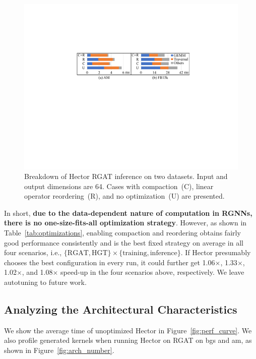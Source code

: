 \begin{figure}[!htbp]
\centering
\includegraphics[width=
\linewidth]{figures/Hector/FB15K.AM.BreakdownEvalv3.compact.pdf}
\caption{\label{fig:perf_analysis} Breakdown of Hector RGAT inference on two datasets. Input and output dimensions are 64. Cases with compaction~(C), linear operator reordering~(R), and no optimization~(U) are presented.}
\end{figure}

In short, \textbf{due to the data-dependent nature of computation in RGNNs, there is no one-size-fits-all optimization strategy}. However, as shown in Table~\ref{tab:optimizations}, enabling compaction and reordering obtains fairly good performance consistently and is the best fixed strategy on average in all four scenarios, i.e., $\{\text{RGAT}, \text{HGT}\}\times\{\text{training},\text{inference}\}$. If Hector presumably chooses the best configuration in every run, it could further get 1.06$\times$, 1.33$\times$, 1.02$\times$, and 1.08$\times$ speed-up in the four scenarios above, respectively. We leave autotuning to future work.






\subsection{Analyzing the Architectural Characteristics}
\label{sec:arch_analysis}

We show the average time of unoptimized Hector in Figure~\ref{fig:perf_curve}. We also profile generated kernels when running Hector on RGAT on bgs and am, as shown in Figure~\ref{fig:arch_number}.






